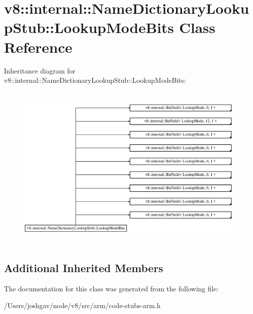 \hypertarget{classv8_1_1internal_1_1_name_dictionary_lookup_stub_1_1_lookup_mode_bits}{}\section{v8\+:\+:internal\+:\+:Name\+Dictionary\+Lookup\+Stub\+:\+:Lookup\+Mode\+Bits Class Reference}
\label{classv8_1_1internal_1_1_name_dictionary_lookup_stub_1_1_lookup_mode_bits}
Inheritance diagram for v8\+:\+:internal\+:\+:Name\+Dictionary\+Lookup\+Stub\+:\+:Lookup\+Mode\+Bits\+:\begin{figure}[H]
\begin{center}
\leavevmode
\includegraphics[height=8.163265cm]{classv8_1_1internal_1_1_name_dictionary_lookup_stub_1_1_lookup_mode_bits}
\end{center}
\end{figure}
\subsection*{Additional Inherited Members}


The documentation for this class was generated from the following file\+:\begin{DoxyCompactItemize}
\item 
/\+Users/joshgav/node/v8/src/arm/code-\/stubs-\/arm.\+h\end{DoxyCompactItemize}
